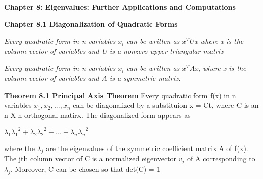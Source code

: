 \documentclass{article}
\begin{document}
\textbf {Chapter 8: Eigenvalues: Further Applications and Computations}

\textbf {Chapter 8.1 Diagonalization of Quadratic Forms}

\textit {Every quadratic form in n variables $x_i$ can be written as $x^T U$x where x is the column vector of variables and U is a nonzero upper-triangular matrix}

\textit {Every quadratic form in n variables $x_i$ can be written as $x^T A$x, where x is the column vector of variables and A is a symmetric matrix.}

\textbf {Theorem 8.1 Principal Axis Theorem} Every quadratic form f(x) in n variables $x_1, x_2, ... , x_n$ can be diagonalized by a substituion x = Ct, where C is an n X n orthogonal matirx. The diagonalized form appears as

\begin{center}
$\lambda_1 {\lambda_1}^2 + \lambda_2 {\lambda_2}^2 + ... + \lambda_n {\lambda_n}^2$
\end{center}

where the $\lambda_j$ are the eigenvalues of the symmetric coefficient matrix A of f(x). The jth column vector of C is a normalized eigenvector $v_j$ of A corresponding to $\lambda_j$. Moreover, C can be chosen so that det(C) = 1
\end{document}

